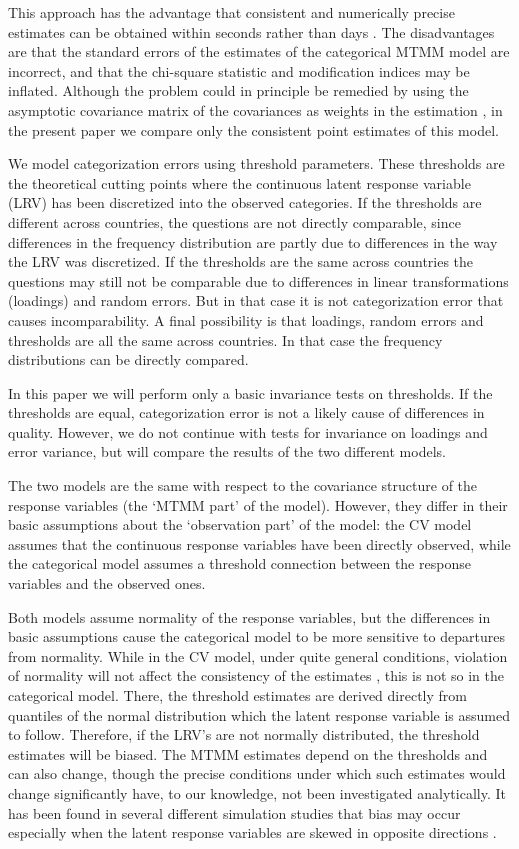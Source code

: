 \documentclass[a4paper,12pt]{article}
\begin{document}
This approach has the advantage that consistent and numerically precise estimates can be obtained within seconds rather than days \citep{muthen_latent_2002}. The disadvantages are that the standard errors of the estimates of the categorical MTMM model are incorrect, and that the chi-square statistic and modification indices may be inflated. Although the problem could in principle be remedied by using the asymptotic covariance matrix of the covariances as weights in the estimation \citep{joreskog_new_1990}, in the present paper we compare only the consistent point estimates of this model.


We model categorization errors using threshold parameters. These thresholds are the theoretical cutting points where the continuous latent response variable (LRV) has been discretized into the observed categories.  If the thresholds are different across countries, the questions are not directly comparable, since differences in the frequency distribution are partly due to differences in the way the LRV was discretized. If the thresholds are the same across countries the questions may still not be comparable due to differences in linear transformations (loadings) and random errors. But in that case it is not categorization error that causes incomparability. A final possibility is that loadings, random errors and thresholds are all the same across countries. In that case the frequency distributions can be directly compared. 

In this paper we will perform only a basic invariance tests on thresholds. If the thresholds are equal, categorization error is not a likely cause of differences in quality. However, we do not continue with tests for invariance on loadings and error variance, but will compare the results of the two different models.


The two models are the same with respect to the covariance structure of the response variables (the `MTMM part' of the model). However, they differ in their basic assumptions about the `observation part' of the model: the CV model assumes that the continuous response variables have been directly observed, while the categorical model assumes a threshold connection between the response variables and the observed ones. 

Both models assume normality of the response variables, but the differences in basic assumptions cause the categorical model to be more sensitive to departures from normality. While in the CV model, under quite general conditions, violation of normality will not affect the consistency of the estimates \citep{satorra_robustness_1990}, this is not so in the categorical model. There, the threshold estimates are derived directly from quantiles of the normal distribution which the latent response variable is assumed to follow. Therefore, if the LRV's are not normally distributed, the threshold estimates will be biased. The MTMM estimates depend on the thresholds and can also change, though the precise conditions under which such estimates would change significantly have, to our knowledge, not been investigated analytically. It has been found in several different simulation studies that bias may occur especially when the latent response variables are skewed in opposite directions \citep{coenders_structural_1996}. 
\end{document}
